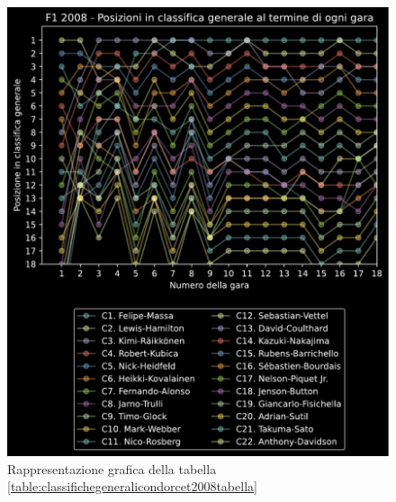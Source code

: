 \documentclass[12pt,a4paper,openright,twoside]{book}
\begin{document}
\begin{figure}[H]
    \centering
     \includegraphics[width=\linewidth]{figures/condorcetstandings2008.pdf}
     \caption{Rappresentazione grafica della tabella \ref{table:classifichegeneralicondorcet2008tabella} }
     \label{fig:classifichegeneralicondorcet2008figura}
 \end{figure}
\end{document}

